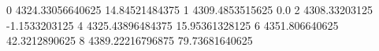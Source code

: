 0 4324.33056640625 14.84521484375
1 4309.4853515625 0.0
2 4308.33203125 -1.1533203125
4 4325.43896484375 15.95361328125
6 4351.806640625 42.3212890625
8 4389.22216796875 79.73681640625
